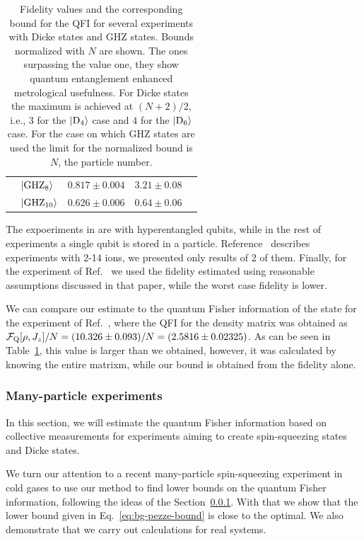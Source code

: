 \begin{table}
\begin{center}
\begin{tabular}{| l | l | l | l | l |}
        & $\vert \textnormal{GHZ}_{8} \rangle$  & $0.817\pm0.004$ & $3.21\pm0.08$ & \citep{Monz2011} \\
        & $\vert \textnormal{GHZ}_{10} \rangle$ & $0.626\pm0.006$ & $0.64\pm0.06$ & \citep{Monz2011} \\ \hline
    \end{tabular}
  \end{center}
  \caption[Bounds on QFI for experimental data when fidelities are measured]{Fidelity values and the corresponding bound for the QFI for several experiments with Dicke states and GHZ states.
  Bounds normalized with $N$ are shown.
  The ones surpassing the value one, they show quantum entanglement enhanced metrological usefulness.
  For Dicke states the maximum is achieved at $(N+2)/2$, i.e., $3$ for the $\vert \textnormal{D}_{4} \rangle$ case and $4$ for the $\vert \textnormal{D}_{6} \rangle$ case.
  For the case on which GHZ states are used the limit for the normalized bound is $N$, the particle number.}
  \label{tab:lt-results-for-fidelities}
\end{table}
The expoeriments in \citep{Gao2010,Chiuri2012} are with hyperentangled qubits, while in the rest of experiments a single qubit is stored in a particle.
Reference~\citep{Monz2011} describes experiments with 2-14 ions, we presented only results of 2 of them.
Finally, for the experiment of Ref.~\citep{Zhao2004} we used the fidelity estimated using reasonable assumptions discussed in that paper, while the worst case fidelity is lower.

We can compare our estimate to the quantum Fisher information of the state for the experiment of Ref.~\citep{Krischek2011}, where the QFI for the density matrix was obtained as $\mathcal{F}_{\textnormal{Q}}[\rho,J_z]/N=(10.326\pm0.093)/N=(2.5816\pm0.02325)$.
As can be seen in Table~\ref{tab:lt-results-for-fidelities}, this value is larger than we obtained, however, it was calculated by knowing the entire matrixm, while our bound is obtained from the fidelity alone.

\subsubsection{Many-particle experiments}
In this section, we will estimate the quantum Fisher information based on collective measurements for experiments aiming to create spin-squeezing states and Dicke states.


We turn our attention to a recent many-particle spin-squeezing experiment in cold gases to use our method to find lower bounds on the quantum Fisher information, following the ideas of the Section~\ref{}.
With that we show that the lower bound given in Eq.~\eqref{eq:bg-pezze-bound} is close to the optimal.
We also demonstrate that we carry out calculations for real systems.

